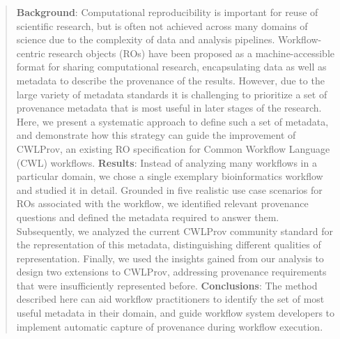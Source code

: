 %


\begin{abstract}
\textbf{Background}: %
Computational reproducibility is important for reuse of scientific research,
but is often not achieved across many domains of science due to the complexity of data and analysis pipelines. Workflow-centric research objects (ROs) have been proposed as a machine-accessible format for sharing computational research, encapsulating data as well as metadata to describe the provenance of the results. However, due to the large variety of metadata standards it is challenging to prioritize a set of provenance metadata %
that is most useful in later stages of the research. 
Here, we present a %
systematic approach to define such a set of metadata, and demonstrate how this strategy can guide the improvement of CWLProv, an existing RO specification for Common Workflow Language (CWL) workflows.
\textbf{Results}: %
Instead of analyzing many workflows in a particular domain, we chose a single exemplary bioinformatics workflow and studied it in detail. 
Grounded in five realistic use case scenarios for ROs associated with the workflow, 
we identified relevant provenance questions and defined the metadata required to answer them. 
Subsequently, we analyzed the current CWLProv community standard for the representation of this metadata, distinguishing different qualities of representation. Finally, we used the insights gained from our analysis to design two extensions to CWLProv, addressing provenance requirements that were insufficiently represented before. 
\textbf{Conclusions}: %
The method described here can aid workflow practitioners to identify the set of most useful metadata in their domain, and guide workflow system developers to implement automatic capture of provenance during workflow execution.  
\end{abstract}



